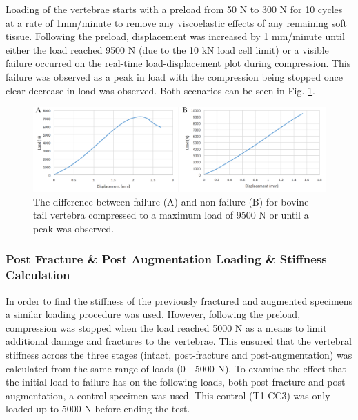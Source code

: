 Loading of the vertebrae starts with a preload from 50 N to 300 N for
10 cycles at a rate of 1mm/minute to remove any viscoelastic effects of any remaining soft
tissue. Following the preload, displacement was increased by 1 mm/minute
until either the load reached 9500 N (due to the 10 kN load cell limit)
or a visible failure occurred on the real-time load-displacement plot during compression.
This failure was observed as a peak in load with the compression being stopped once
clear decrease in load was observed. Both scenarios can be seen in Fig. \ref{fig:failure_non_failure}.



\begin{figure}[ht!]
\centering
\includegraphics[width=16cm]{images/comparing_failureand_nonfailure.png}
\caption{The difference between failure (A) and non-failure (B) for bovine tail vertebra compressed to a maximum load of 9500 N or until a peak was observed.}
\label{fig:failure_non_failure}
\end{figure}

\subsubsection{Post Fracture \& Post
Augmentation Loading \& Stiffness
Calculation}\label{post-fracture-post-vertebroplasty}

In order to find the stiffness of the previously fractured and augmented
specimens a similar loading procedure was used. However, following the
preload, compression was stopped when the load reached 5000 N as a means
to limit additional damage and fractures to the vertebrae. This ensured that the vertebral stiffness across the three stages (intact,
post-fracture and post-augmentation) was calculated from the same range of loads (0 - 5000 N). To examine the effect that the initial load to failure has on the following loads, both post-fracture and post-augmentation, a control specimen was used. This control (T1 CC3) was only loaded up to 5000 N before ending the test.




